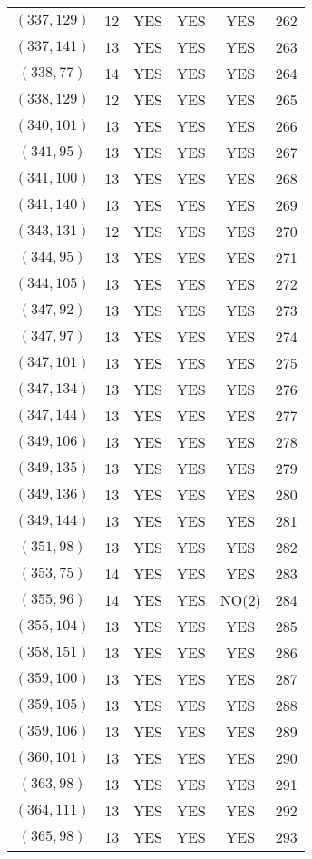 \begin{longtable}{|c|c|c|c|c|c|}
$(337, 129)$ & 12 & YES & YES & YES & 262\\
$(337, 141)$ & 13 & YES & YES & YES & 263\\
$(338, 77)$ & 14 & YES & YES & YES & 264\\
$(338, 129)$ & 12 & YES & YES & YES & 265\\
$(340, 101)$ & 13 & YES & YES & YES & 266\\
$(341, 95)$ & 13 & YES & YES & YES & 267\\
$(341, 100)$ & 13 & YES & YES & YES & 268\\
$(341, 140)$ & 13 & YES & YES & YES & 269\\
$(343, 131)$ & 12 & YES & YES & YES & 270\\
$(344, 95)$ & 13 & YES & YES & YES & 271\\
$(344, 105)$ & 13 & YES & YES & YES & 272\\
$(347, 92)$ & 13 & YES & YES & YES & 273\\
$(347, 97)$ & 13 & YES & YES & YES & 274\\
$(347, 101)$ & 13 & YES & YES & YES & 275\\
$(347, 134)$ & 13 & YES & YES & YES & 276\\
$(347, 144)$ & 13 & YES & YES & YES & 277\\
$(349, 106)$ & 13 & YES & YES & YES & 278\\
$(349, 135)$ & 13 & YES & YES & YES & 279\\
$(349, 136)$ & 13 & YES & YES & YES & 280\\
$(349, 144)$ & 13 & YES & YES & YES & 281\\
$(351, 98)$ & 13 & YES & YES & YES & 282\\
$(353, 75)$ & 14 & YES & YES & YES & 283\\
$(355, 96)$ & 14 & YES & YES & NO(2) & 284\\
$(355, 104)$ & 13 & YES & YES & YES & 285\\
$(358, 151)$ & 13 & YES & YES & YES & 286\\
$(359, 100)$ & 13 & YES & YES & YES & 287\\
$(359, 105)$ & 13 & YES & YES & YES & 288\\
$(359, 106)$ & 13 & YES & YES & YES & 289\\
$(360, 101)$ & 13 & YES & YES & YES & 290\\
$(363, 98)$ & 13 & YES & YES & YES & 291\\
$(364, 111)$ & 13 & YES & YES & YES & 292\\
$(365, 98)$ & 13 & YES & YES & YES & 293\\

\end{longtable}
